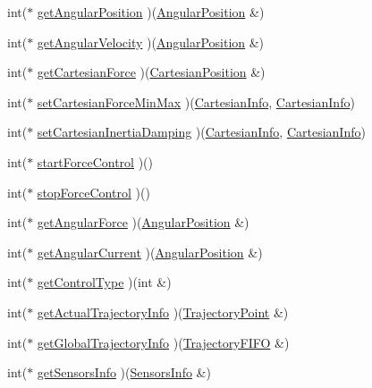 \begin{DoxyCompactItemize}
\item 
int($\ast$ \hyperlink{classjaco_1_1_jaco_a_p_i_a8d2e9b00c5953e3fc024f86e128f01df}{get\+Angular\+Position} )(\hyperlink{struct_angular_position}{Angular\+Position} \&)
\item 
int($\ast$ \hyperlink{classjaco_1_1_jaco_a_p_i_af50f11de8f7c2b661f53d76f576eb3ae}{get\+Angular\+Velocity} )(\hyperlink{struct_angular_position}{Angular\+Position} \&)
\item 
int($\ast$ \hyperlink{classjaco_1_1_jaco_a_p_i_af82e531abda1dd3e87ab33f1f5474ca5}{get\+Cartesian\+Force} )(\hyperlink{struct_cartesian_position}{Cartesian\+Position} \&)
\item 
int($\ast$ \hyperlink{classjaco_1_1_jaco_a_p_i_aa592360dc8cc3d2a2343621d8ec8dac5}{set\+Cartesian\+Force\+Min\+Max} )(\hyperlink{struct_cartesian_info}{Cartesian\+Info}, \hyperlink{struct_cartesian_info}{Cartesian\+Info})
\item 
int($\ast$ \hyperlink{classjaco_1_1_jaco_a_p_i_a24709f5e768c7aab4a9b1de1308d65ea}{set\+Cartesian\+Inertia\+Damping} )(\hyperlink{struct_cartesian_info}{Cartesian\+Info}, \hyperlink{struct_cartesian_info}{Cartesian\+Info})
\item 
int($\ast$ \hyperlink{classjaco_1_1_jaco_a_p_i_a548f1d6251582bb4fe9cb5cb69f08b2d}{start\+Force\+Control} )()
\item 
int($\ast$ \hyperlink{classjaco_1_1_jaco_a_p_i_ac3881ef354400b32a4d71796dba66d67}{stop\+Force\+Control} )()
\item 
int($\ast$ \hyperlink{classjaco_1_1_jaco_a_p_i_aea22577840f066fb2d5da409e50f9760}{get\+Angular\+Force} )(\hyperlink{struct_angular_position}{Angular\+Position} \&)
\item 
int($\ast$ \hyperlink{classjaco_1_1_jaco_a_p_i_ac24c226ba8ee3b72618a84eaab9d722a}{get\+Angular\+Current} )(\hyperlink{struct_angular_position}{Angular\+Position} \&)
\item 
int($\ast$ \hyperlink{classjaco_1_1_jaco_a_p_i_aff9218e13471d4d021f8144738c73ff1}{get\+Control\+Type} )(int \&)
\item 
int($\ast$ \hyperlink{classjaco_1_1_jaco_a_p_i_af2f83a5e6bef4f10dc4c7d714a593e4c}{get\+Actual\+Trajectory\+Info} )(\hyperlink{struct_trajectory_point}{Trajectory\+Point} \&)
\item 
int($\ast$ \hyperlink{classjaco_1_1_jaco_a_p_i_a9638cf9678156df980370819dabd685e}{get\+Global\+Trajectory\+Info} )(\hyperlink{struct_trajectory_f_i_f_o}{Trajectory\+F\+I\+FO} \&)
\item 
int($\ast$ \hyperlink{classjaco_1_1_jaco_a_p_i_a390a9f4759fe2bd34a43634a17598638}{get\+Sensors\+Info} )(\hyperlink{struct_sensors_info}{Sensors\+Info} \&)

\end{DoxyCompactItemize}
